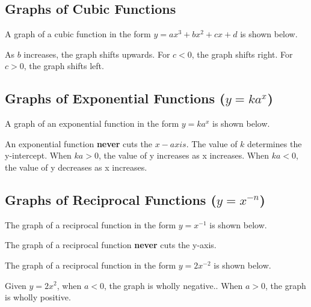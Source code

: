 \documentclass{report}
\begin{document}
\begin{flushleft}
\subsection{Graphs of Cubic Functions}
A graph of a cubic function in the form $y=ax^3+bx^2+cx+d$ is shown below.
 \par
As $b$ increases, the graph shifts upwards. For $c<0$, the graph shifts right. For $c>0$, the graph shifts left.
\subsection{Graphs of Exponential Functions ($y=ka^x$)}
A graph of an exponential function in the form $y=ka^x$ is shown below.
\par
An exponential function \textbf{never} cuts the $x-axis$. The value of $k$ determines the y-intercept. When $ka>0$, the value of y increases as x increases. When $ka<0$, the value of y decreases as x increases.

\subsection{Graphs of Reciprocal Functions ($y=x^{-n}$)}
The graph of a reciprocal function in the form $y=x^{-1}$ is shown below.
\par
The graph of a reciprocal function \textbf{never} cuts the y-axis.\par

The graph of a reciprocal function in the form $y=2x^{-2}$ is shown below.
\par
Given $y=2x^{2}$, when $a<0$, the graph is wholly negative.. When $a>0$, the graph is wholly positive.



\end{flushleft}
\end{document}
